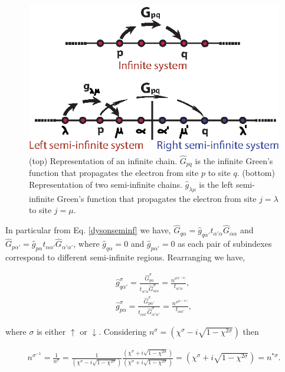 \documentclass[10pt,prb,showpacs,amssymb,floatfix]{revtex4-1}
\newcommand{\dna}{\downarrow}
\newcommand{\upa}{\uparrow}
\newcommand{\alp}{\alpha}
\newcommand{\lam}{\lambda}
\newcommand{\sg}{\sigma}
\newcommand{\h}{\hat}
\begin{document}
\begin{figure}[ht]
\centering
\includegraphics{fig3.eps}
\caption{(top) Representation of an infinite chain. $\h G_{pq}$ is the infinite Green's function that propagates the electron from site $p$ to site $q$. (bottom) Representation of two semi-infinite chains. $\h g_{\lam \mu}$ is the left semi-infinite Green's function that propagates the electron from site $j=\lam$ to site $j=\mu$.}
\label{dyson}
\end{figure}


In particular from Eq. \eqref{dysonseminf} we have, $\h G_{q\alp}= \h g_{q\alp'} t_{\alp'\alp} \h G_{\alp \alp}$ and  $\h G_{p\alp'}= \h g_{p\alp} t_{\alp\alp'} \h G_{\alp' \alp'}$, where $\h g_{ q\alp} = 0$ and $\h g_{p\alp'}=0$ as each pair of subindexes correspond to different semi-infinite regions. Rearranging we have,

\begin{align}
\label{202}
\h g^\sg_{q\alp'} = \frac{\h G^\sg_{q\alp}}{ t_{\alp'\alp} \h G^\sg_{\alp \alp}} =   \frac{ n^{\sg^{|q-\alp|}}}{ t_{\alp'\alp}  }, \\
\h g^\sg_{p\alp}  = \frac{\h G^\sg_{p\alp'}}{t_{\alp\alp'} \h G^\sg_{\alp' \alp'}} =  \frac{ n^{\sg^{|p-\alp'|}}}{ t_{\alp\alp'}  },
\label{203}
\end{align}

where $\sg$ is either $\upa$ or $\dna$. Considering  $n^{\sg} = (\chi^{\sg } - i\sqrt{1 -\chi^{2 \sg }  }) $ then

\begin{align}
n^{\sg^{-1}}  = \frac{1}{n^{\sg}} = \frac{1}{(\chi^{\sg } - i\sqrt{1 -\chi^{2 \sg }  })}\frac{(\chi^{\sg } + i\sqrt{1 -\chi^{2 \sg }  })}{(\chi^{\sg } + i\sqrt{1 -\chi^{2 \sg }  })} = (\chi^{\sg } + i\sqrt{1 -\chi^{2 \sg }  }) = n^{*\sg}. 
\end{align}
\end{document}

